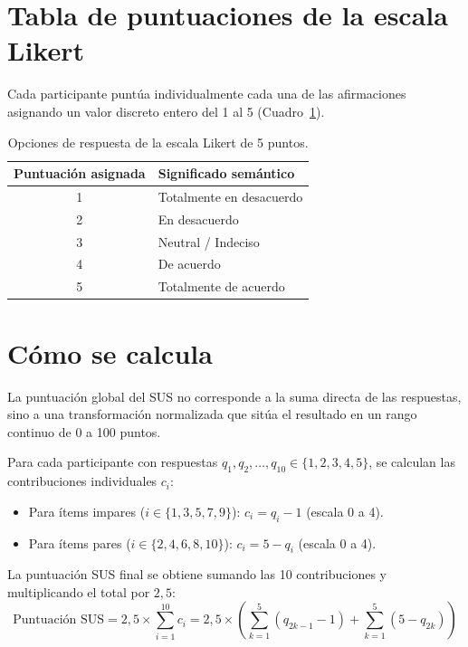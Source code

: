 \section{Tabla de puntuaciones de la escala Likert}
Cada participante puntúa individualmente cada una de las afirmaciones asignando un valor discreto entero del 1 al 5 (Cuadro~\ref{tab:likert-escala}).

\begin{table}[htbp]
\centering
\begin{tabular}{cl}
\toprule
\textbf{Puntuación asignada} & \textbf{Significado semántico} \\
\midrule
1 & Totalmente en desacuerdo \\
2 & En desacuerdo \\
3 & Neutral / Indeciso \\
4 & De acuerdo \\
5 & Totalmente de acuerdo \\
\bottomrule
\end{tabular}
\caption{Opciones de respuesta de la escala Likert de 5 puntos.}
\label{tab:likert-escala}
\end{table}

\section{Cómo se calcula}
La puntuación global del SUS no corresponde a la suma directa de las respuestas, sino a una transformación normalizada que sitúa el resultado en un rango continuo de 0 a 100 puntos.

Para cada participante con respuestas $q_1, q_2, \dots, q_{10} \in \{1, 2, 3, 4, 5\}$, se calculan las contribuciones individuales $c_i$:
\begin{itemize}
    \item Para ítems impares ($i \in \{1, 3, 5, 7, 9\}$): $c_i = q_i - 1$ (escala 0 a 4).
    \item Para ítems pares ($i \in \{2, 4, 6, 8, 10\}$): $c_i = 5 - q_i$ (escala 0 a 4).
\end{itemize}

La puntuación SUS final se obtiene sumando las 10 contribuciones y multiplicando el total por $2{,}5$:
\begin{equation}
\text{Puntuación SUS} = 2{,}5 \times \sum_{i=1}^{10} c_i = 2{,}5 \times \left( \sum_{k=1}^5 (q_{2k-1} - 1) + \sum_{k=1}^5 (5 - q_{2k}) \right)
\end{equation}

